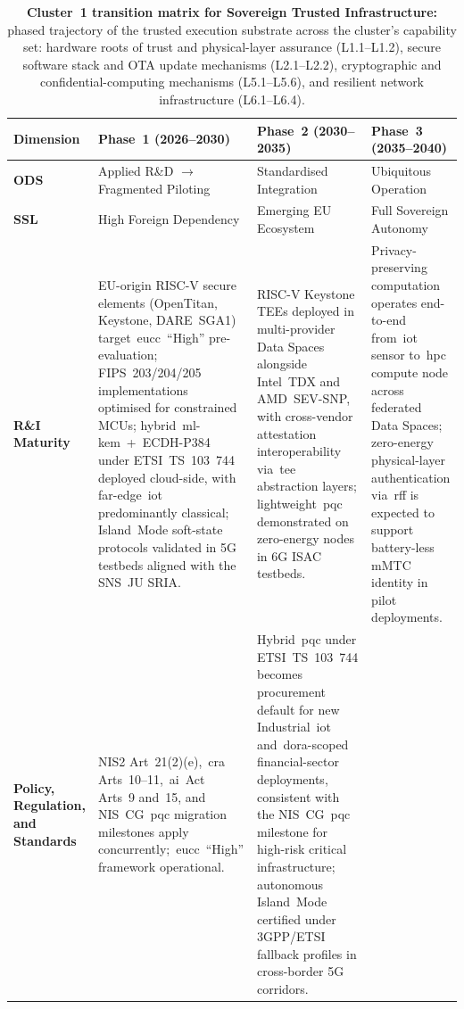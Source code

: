 \documentclass{ieeeaccess}
\begin{document}
\begin{table}[t]
\caption{\textbf{Cluster~1 transition matrix for Sovereign Trusted Infrastructure:} phased trajectory of the trusted execution substrate across the cluster's capability set: hardware roots of trust and physical-layer assurance (L1.1--L1.2), secure software stack and OTA update mechanisms (L2.1--L2.2), cryptographic and confidential-computing mechanisms (L5.1--L5.6), and resilient network infrastructure (L6.1--L6.4).}
\label{tab:c1}
\centering
\footnotesize
\renewcommand{\arraystretch}{1.15}
\begin{tabularx}{\textwidth}{@{}>{\bfseries}p{} X X X@{}}
\toprule
\textbf{Dimension} & \textbf{Phase~1 (2026--2030)} & \textbf{Phase~2 (2030--2035)} & \textbf{Phase~3 (2035--2040)} \\
\midrule
ODS &
Applied R\&D $\rightarrow$ Fragmented Piloting &
Standardised Integration &
Ubiquitous Operation \\
\addlinespace[2pt]
SSL &
High Foreign Dependency &
Emerging EU Ecosystem &
Full Sovereign Autonomy \\
\midrule
R\&I Maturity &
EU-origin RISC-V secure elements (OpenTitan, Keystone, DARE~SGA1) target~\gls{eucc}~``High'' pre-evaluation; FIPS~203/204/205 implementations optimised for constrained MCUs; hybrid~\gls{ml-kem}~+~ECDH-P384 under ETSI~TS~103~744 deployed cloud-side, with far-edge~\gls{iot} predominantly classical; Island~Mode soft-state protocols validated in 5G testbeds aligned with the SNS~JU SRIA. &
RISC-V Keystone TEEs deployed in multi-provider Data Spaces alongside Intel~TDX and AMD~SEV-SNP, with cross-vendor attestation interoperability via~\gls{tee} abstraction layers; lightweight~\gls{pqc} demonstrated on zero-energy nodes in 6G ISAC testbeds. &
Privacy-preserving computation operates end-to-end from~\gls{iot} sensor to~\gls{hpc} compute node across federated Data Spaces; zero-energy physical-layer authentication via~\gls{rff} is expected to support battery-less mMTC identity in pilot deployments. \\
\addlinespace[2pt]
Policy, Regulation, and Standards &
NIS2 Art~21(2)(e),~\gls{cra} Arts~10--11,~\gls{ai}~Act Arts~9 and~15, and NIS~CG~\gls{pqc} migration milestones apply concurrently;~\gls{eucc}~``High'' framework operational. &
Hybrid~\gls{pqc} under ETSI~TS~103~744 becomes procurement default for new Industrial~\gls{iot} and~\gls{dora}-scoped financial-sector deployments, consistent with the NIS~CG~\gls{pqc} milestone for high-risk critical infrastructure; autonomous Island~Mode certified under 3GPP/ETSI fallback profiles in cross-border 5G corridors. &

\end{tabularx}
\end{table}
\end{document}
